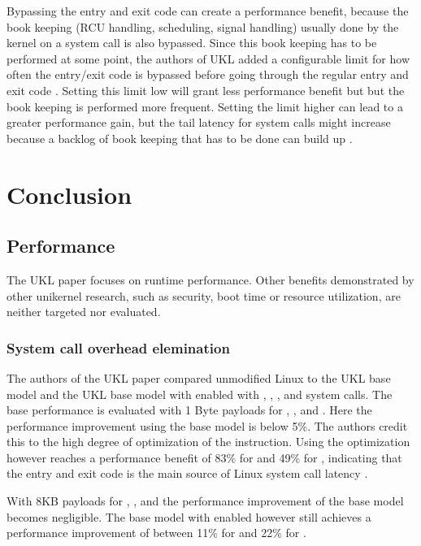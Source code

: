 \documentclass[10pt,twocolumn,a4paper]{article}
\begin{document}
      Bypassing the entry and exit code can create a performance benefit, because the book keeping
      (RCU handling, scheduling, signal handling) usually done by the kernel on a system call is also
      bypassed.
      Since this book keeping has to be performed at some point, the authors of UKL added a configurable
      limit for how often the entry/exit code is bypassed before going through the regular entry 
      and exit code \cite{ukl-github-bypass}.
      Setting this limit low will grant less performance benefit but but the book keeping is performed
      more frequent.
      Setting the limit higher can lead to a greater performance gain, but the tail latency for system 
      calls might increase because a backlog of book keeping that has to be done can build 
      up \cite{ukl-github-bypass}.

\section{Conclusion}\label{sec:conclusion}
  \subsection{Performance}
    The UKL paper focuses on runtime performance.
    Other benefits demonstrated by other unikernel research, such as security, boot time or
    resource utilization, are neither targeted nor evaluated.
    
    \subsubsection{System call overhead elemination}
      The authors of the UKL paper compared unmodified Linux to the UKL base model
      and the UKL base model with  enabled with , ,
      ,  and  system calls.
      The base performance is evaluated with 1 Byte payloads for ,
      ,  and .
      Here the performance improvement using the base model is below 5\%.
      The authors credit this to the high degree of optimization of the 
      instruction.
      Using the  optimization however reaches a performance benefit of
      83\% for  and 49\% for , indicating that the entry
      and exit code is the main source of Linux system call latency \cite{raza23}.

      With 8KB payloads for , ,  and 
      the performance improvement of the base model becomes negligible. 
      The base model with  enabled however still achieves a performance 
      improvement of between 11\% for  and 22\% for .
\end{document}
